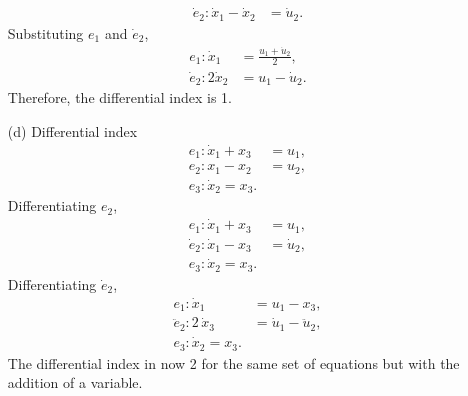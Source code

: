 \begin{enumerate}
\begin{align*}
		\dot e_2:\dot x_1 - \dot x_2 &= \dot u_2.
	\end{align*}
	Substituting $ e_1 $ and $ \dot e_2 $,
	\begin{align*}
		e_1:\dot x_1 &= \frac{u_1 + \dot u_2}{2},\\
		\dot e_2:2\dot x_2 &= u_1 - \dot u_2 .
	\end{align*}
	Therefore, the differential index is 1.\\
	\item[(d)] Differential index
	\begin{align*}
		e_1:\dot x_1 + x_3 &= u_1,\\
		e_2:x_1 - x_2 &= u_2,\\
		e_3:\dot x_2 = x_3.
	\end{align*}
	Differentiating $ e_2 $,
	\begin{align*}
		e_1:\dot x_1 + x_3 &= u_1,\\
		\dot e_2:\dot x_1 - x_3 &= \dot u_2,\\
		e_3:\dot x_2 = x_3.
	\end{align*}
	Differentiating $ \dot e_2 $,
		\begin{align*}
		e_1:\dot x_1 &= u_1 - x_3 ,\\
		\ddot e_2:2\,\dot x_3 &=  \dot u_1 - \ddot u_2,\\
		e_3:\dot x_2 = x_3.
	\end{align*}
	The differential index in now 2 for the same set of equations but with the addition of a variable.
\end{enumerate}